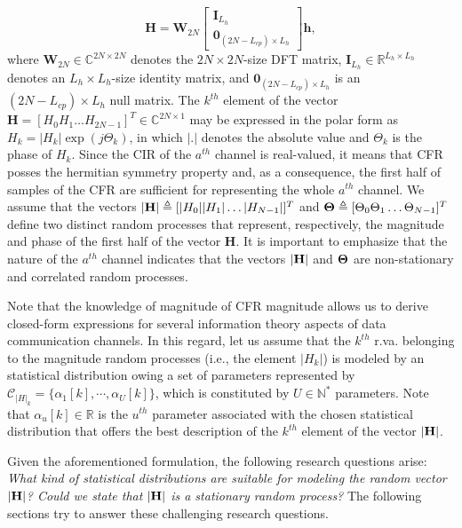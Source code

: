\documentclass[journal]{IEEEtran}
\begin{document}
\begin{equation}
\mathbf{H} = \mathbf{W}_{2N}  \begin{bmatrix} \mathbf{I}_{L_h} \\ \mathbf{0}_{(2N-L_{cp})\times L_{h}} \end{bmatrix} \mathbf{h},
\end{equation}
where $\mathbf{W}_{2N} \in \mathbb{C}^{2N\times 2N}$ denotes the $2N \times 2N$-size \ac{DFT} matrix, $ \mathbf{I}_{L_h} \in \mathbb{R}^{L_h\times L_h}$ denotes an $L_h\times L_h$-size identity matrix, and $ \mathbf{0}_{(2N-L_{cp})\times L_{h}} $ is an $ (2N-L_{cp})\times L_{h}$ null matrix. The $k^{th}$ element of the vector $\mathbf{H}=[H_0 H_1 \ldots H_{2N-1}]^T \in \mathbb{C}^{2N\times 1}$ may be expressed in the polar form as $H_k=|H_k|\exp(j \Theta_k)$, in which $|.|$ denotes the absolute value and $\Theta_k$ is the phase of $H_k$. Since the \ac{CIR} of the $a^{th}$ channel is real-valued, it means that \ac{CFR} posses the hermitian symmetry property and, as a consequence, the first half of samples of the \ac{CFR} are sufficient for representing the whole $a^{th}$ channel. We assume that the vectors $|{\bf H}|\triangleq [|H_0||H_1|\ldots |H_{N-1}|]^T$ and ${\bf \Theta}\triangleq[\Theta_0\Theta_1\ldots \Theta_{N-1}]^T$ define two distinct random processes that represent, respectively, the magnitude and phase of the first half of the vector $\mathbf{H}$. It is important to emphasize that the nature of the $a^{th}$ channel indicates that the vectors $|{\bf H}|$ and ${\bf \Theta}$ are non-stationary and correlated random processes. 
 
Note that the knowledge of magnitude of \ac{CFR} magnitude %
allows us to derive closed-form expressions for several information theory aspects of data communication channels. In this regard, let us assume that the $k^{th}$ \ac{r.va.} belonging to the magnitude random processes (i.e., the element $|H_k|$) is modeled by an statistical distribution owing a set of parameters represented by $\mathcal{C}_{|H|_k} = \{ \alpha_{1}[k], \cdots, \alpha_{U}[k] \}$, which is constituted by $U \in \mathbb{N}^*$ parameters. Note that $\alpha_{u}[k] \in \mathbb{R}$ is the $u^{th}$ parameter associated with the chosen statistical distribution that offers the best description of the $k^{th}$ element of the vector $|{\bf H}|$.

Given the aforementioned formulation, the following research questions arise: \textit{What kind of statistical distributions are suitable for modeling the random vector $|{\bf H}|$? Could we state that $|{\bf H}|$ is a stationary random process?} The following sections try to answer these challenging research questions.
\end{document}
